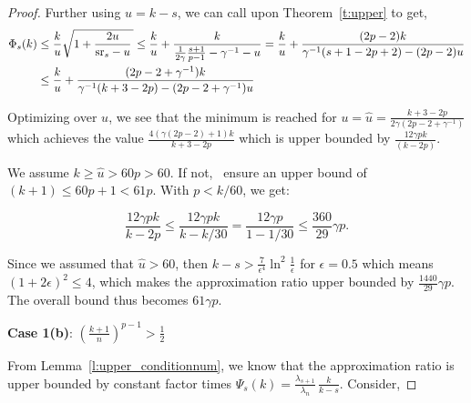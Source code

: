 \documentclass{article}
\begin{document}
\begin{proof}
  
  
  
  Further using $u =
  k-s$, we can call upon Theorem~\ref{t:upper} to get,  
  \begin{align*}
    \Phi_s(k) &\leq \frac{k}{u}\sqrt{1+\frac{2u}{ {\mathrm{sr}}_s-u }\,} \leq
    \frac{k}{u} + \frac{k}{  \frac{1}{2\gamma} \frac{s+1}{p-1} -
      \gamma^{-1} - u } = \frac{k}{u} + \frac{(2p-2)k}{
                \gamma^{-1}(s+1 - 2 p +2) - (2p-2)u } \\
    &\leq \frac{k}{u} +
    \frac{(2p-2 + \gamma^{-1})k}{   \gamma^{-1}(k+3 -2 p)  - (2p-2 +
    \gamma^{-1})u }
    \end{align*}
  
  Optimizing over $u$, we see that the minimum is reached for $u =
  \hat{u} = \frac{k+3-2p}{2\gamma(2p-2+\gamma^{-1})}$ which achieves the value
  $ \frac{4(\gamma(2p-2)+1)k}{k+3 -2 p}$ which is upper bounded by
  $\frac{12\gamma pk}{(k-2p)}$.   
  
  We assume $k \geq \hat{u} > 60p > 60$. If not,~\citet{pca-volume-sampling} ensure an upper bound of $(k+1) \leq 60p+1 < 61p$. With $p < k/60$, we get:
  
  \[ \frac{12\gamma pk}{k-2p} \leq \frac{12\gamma pk}{k-k/30} =
    \frac{12\gamma p}{1-1/30} \leq \frac{360}{29}\gamma  p.  \] 
  
  Since we assumed that $\hat u> 60$, then $k-s> \frac{7}{\epsilon^4}
  \ln^2\frac{1}{\epsilon}$ for $\epsilon = 0.5$ which means
  $(1+2\epsilon)^2 \leq 4$, which makes the approximation ratio upper
  bounded by $ \frac{1440}{29}\gamma p  $. The overall bound
  thus becomes $61 \gamma p$. 
  
  
  \bigskip 
  \textbf{Case 1(b)}: $\left(\frac{k+1}{n}\right)^{p-1} >\frac12$
  
  From Lemma~\ref{l:upper_conditionnum}, we know that the
  approximation ratio is upper bounded by constant factor times
  $\Psi_s(k)=\frac{\lambda_{s+1}}{\lambda_n}\,\frac{k}{k-s}$. Consider,  
  

\end{proof}
\end{document}
